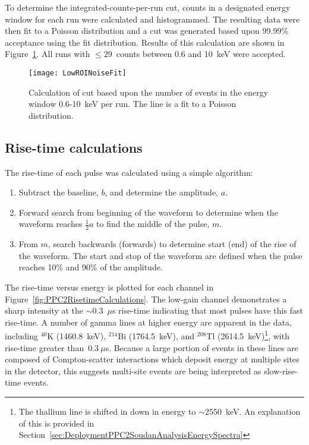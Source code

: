 	To determine the integrated-counts-per-run cut, counts in a designated energy window for each run were calculated and histogrammed.  The resulting data were then fit to a Poisson distribution and a cut was generated based upon 99.99\% acceptance using the fit distribution.  Results of this calculation are shown in Figure~\ref{fig:PPC2NoiseCuts}.  All runs with $\leq29$~counts between 0.6 and 10~keV were accepted.  
	
				\begin{figure}
					\centering
					\texttt{[image: LowROINoiseFit]}
					\caption[Calculation of noise cuts]
					{Calculation of cut based upon the number of events in the energy window 0.6-10~keV per run.  
					The line is a fit to a Poisson distribution.  }
					\label{fig:PPC2NoiseCuts}
				\end{figure}
	
	    	\subsection{Rise-time calculations}
		\label{sec:DeploymentPPC2SoudanAnalysisRisetime}    
			
	The rise-time of each pulse was calculated using a simple algorithm: 
				\begin{enumerate}
					\item Subtract the baseline, $b$, and determine the amplitude, $a$.
					\item Forward search from beginning of the waveform to determine when the waveform reaches $\frac{1}{2}a$ to find the middle of the pulse, $m$.
					\item From $m$, search backwards (forwards) to determine start (end) of the rise of the waveform.  
					The start and stop of the waveform are defined when the pulse reaches 10\% and 90\% of the amplitude.
				\end{enumerate}
The rise-time versus energy is plotted for each channel in Figure~\ref{fig:PPC2RisetimeCalculations}.  The low-gain channel demonstrates a sharp intensity at the $\sim$0.3~$\mu$s rise-time indicating that most pulses have this fast rise-time.  A number of gamma lines at higher energy are apparent in the data, including $^{40}$K (1460.8~keV), $^{214}$Bi (1764.5~keV), and $^{208}$Tl (2614.5~keV)\footnote{The thallium line is shifted in down in energy to $\sim$2550~keV.  An explanation of this is provided in Section~\ref{sec:DeploymentPPC2SoudanAnalysisEnergySpectra}}, with rise-time greater than~$0.3~\mu$s.  Because a large portion of events in these lines are composed of Compton-scatter interactions which deposit energy at multiple sites in the detector, this suggests multi-site events are being interpreted as slow-rise-time events.  
	
